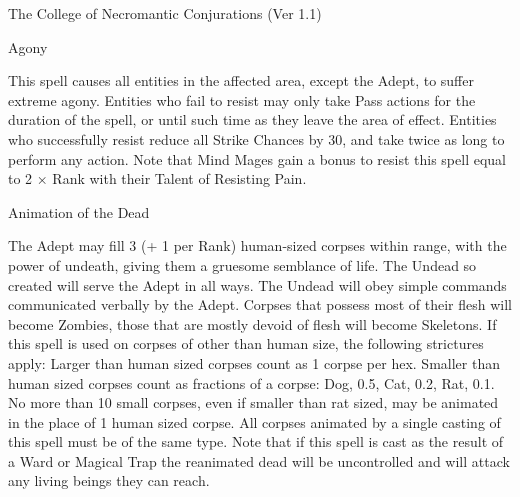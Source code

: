 \begin{Chapter}{The College of Necromantic Conjurations (Ver 1.1)}
\begin{spell}[S-1]{Agony}
\begin{effects}
This spell causes all entities in the affected area, except the Adept,
to suffer extreme agony.  Entities who fail to resist may only take
Pass actions for the duration of the spell, or until such time as they
leave the area of effect.  Entities who successfully resist reduce all
Strike Chances by 30, and take twice as long to perform any action.
Note that Mind Mages gain a bonus to resist this spell equal to 2 ×
Rank with their Talent of Resisting Pain.
\end{effects}
\end{spell}

\begin{spell}[S-2]{Animation of the Dead}
\begin{effects}
The Adept may fill 3 (+ 1 per Rank) human-sized corpses within range,
with the power of undeath, giving them a gruesome semblance of
life. The Undead so created will serve the Adept in all ways. The
Undead will obey simple commands communicated verbally by the
Adept. Corpses that possess most of their flesh will become Zombies,
those that are mostly devoid of flesh will become Skeletons.  If this
spell is used on corpses of other than human size, the following
strictures apply: Larger than human sized corpses count as 1 corpse
per hex. Smaller than human sized corpses count as fractions of a
corpse: Dog, 0.5, Cat, 0.2, Rat, 0.1.  No more than 10 small corpses,
even if smaller than rat sized, may be animated in the place of 1
human sized corpse.  All corpses animated by a single casting of this
spell must be of the same type. Note that if this spell is cast as the
result of a Ward or Magical Trap the reanimated dead will be
uncontrolled and will attack any living beings they can reach.
\end{effects}
\end{spell}


\end{Chapter}
